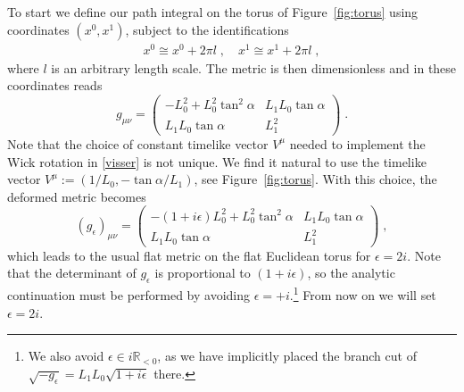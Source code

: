 \documentclass[11pt]{article}
\numberwithin{equation}{section}
\begin{document}
To start we define our path integral on the torus of Figure~\ref{fig:torus} using coordinates $(x^0,x^1)$, subject to the identifications
\begin{align}
x^0 \cong x^0 + 2 \pi l\;, \quad x^1 \cong x^1 + 2\pi l \;,
\end{align}
where $l$ is an arbitrary length scale. The metric is then dimensionless and in these coordinates reads 
\begin{equation}
g_{\mu\nu}= \left(\begin{matrix}
 -L_0^2+L_0^2\tan^2 \alpha & L_1L_0 \tan \alpha \\L_1L_0 \tan \alpha  &L_1^2
\end{matrix}
\right)\;.
\end{equation}
 Note that  the choice of constant timelike vector $V^\mu$ needed to implement the Wick rotation  in \eqref{visser} is not unique. We find it natural to use the timelike vector $V^\mu := (1/L_0,-\tan\alpha/L_1)$, see Figure~\ref{fig:torus}. With this choice, the deformed metric becomes
\begin{equation}
(g_{\epsilon})_{\mu\nu}= \left(\begin{matrix}
 -(1+i\epsilon)L_0^2+L_0^2\tan^2 \alpha & L_1L_0\tan \alpha \\L_1L_0\tan \alpha  &L_1^2
\end{matrix}
\right)\;,
\label{Visser}
\end{equation}
 which leads to the usual flat metric on the flat Euclidean torus for $\epsilon = 2 i $.  Note that the determinant of $g_{\epsilon}$ 
is proportional to $ (1+i\epsilon)$, so the analytic continuation must be performed by
avoiding $\epsilon=+i$.\footnote{We also avoid $\epsilon\in i\mathbb{R}_{<0}$, as
we have implicitly placed the branch cut of
$\sqrt{-g_{\epsilon}}=L_1L_0\sqrt{1+i\epsilon}$ there.} From now on we will set $\epsilon = 2i$. 
\end{document}
